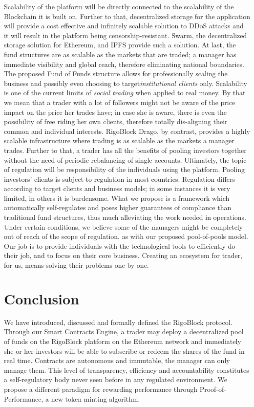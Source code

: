 \documentclass[9pt,oneside]{amsart}
\begin{document}
\begin{multicols}{2}
Scalability of the platform will be directly connected to the scalability of the Blockchain it is built on. Further to that, decentralized storage for the application will provide a cost effective and infinitely scalable solution to DDoS attacks and it will result in the platform being censorship-resistant.
Swarm, the decentralized storage solution for Ethereum, and IPFS provide such a solution.
At last, the fund structures are as scalable as the markets that are traded; a manager has immediate visibility and global reach, therefore eliminating national boundaries. The proposed Fund of Funds structure allows for professionally scaling the business and possibly even choosing to target\textit{institutional clients} only.
Scalability is one of the current limits of \textit{social trading} when applied to real money. By that we mean that a trader with a lot of followers might not be aware of the price impact on the price her trades have; in case she is aware, there is even the possibility of free riding her own clients, therefore totally dis-aligning their common and individual interests. RigoBlock Drago, by contrast, provides a highly scalable infrastructure where trading is as scalable as the markets a manager trades. Further to that, a trader has all the benefits of pooling investors together without the need of periodic rebalancing of single accounts.
Ultimately, the topic of regulation will be responsibility of the individuals using the platform. Pooling investors' clients is subject to regulation in most countries. Regulation differs according to target clients and business models; in some instances it is very limited, in others it is burdensome. What we propose is a framework which automatically self-regulates and poses higher guarantees of compliance than traditional fund structures, thus much alleviating the work needed in operations. Under certain conditions, we believe some of the managers might be completely out of reach of the scope of regulation, as with our proposed pool-of-pools model. Our job is to provide individuals with the technological tools to efficiently do their job, and to focus on their core business. Creating an ecosystem for trader, for us, means solving their problems one by one.

\section{Conclusion} \label{ch:conclusion}

We have introduced, discussed and formally defined the RigoBlock protocol. Through our Smart Contracts Engine, a trader may deploy a decentralized pool of funds on the RigoBlock platform on the Ethereum network and immediately she or her investors will be able to subscribe or redeem the shares of the fund in real time. Contracts are autonomous and immutable, the manager can only manage them. This level of transparency, efficiency and accountability constitutes a self-regulatory body never seen before in any regulated environment. We propose a different paradigm for rewarding performance through Proof-of-Performance, a new token minting algorithm.


\end{multicols}
\end{document}
